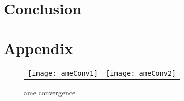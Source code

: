\section{Conclusion}



\section{Appendix}

\begin{figure}[ht]
	\centering
	\begin{tabular}{cc}
	\texttt{[image: ameConv1]} &
	\texttt{[image: ameConv2]}
	\end{tabular}
	\caption{ame convergence}
	\label{fig:ameConv}
\end{figure}









